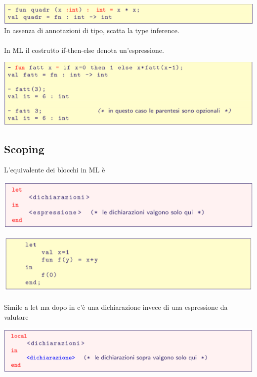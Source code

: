 \documentclass[10pt]{article}
\begin{document}
\includegraphics[scale=0.2]{Immagini/ml2.png}
\\
In assenza di annotazioni di tipo, scatta la type inference.
\\\\
In ML il costrutto if-then-else denota un’espressione.

\includegraphics[scale=0.2]{Immagini/ml3.png}
\subsection{Scoping}
L’equivalente dei blocchi in ML è

\includegraphics[scale=0.2]{Immagini/ml5.png}

\includegraphics[scale=0.2]{Immagini/ml6.png}
\\\\
Simile a let ma dopo in c’è una dichiarazione invece di una
espressione da valutare

\includegraphics[scale=0.2]{Immagini/ml7.png}
\end{document}
